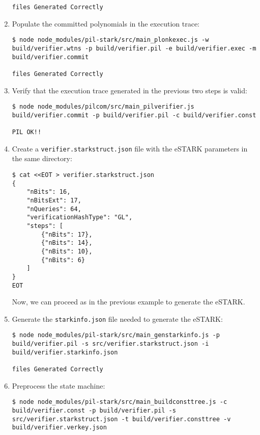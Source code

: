 \begin{enumerate}
\begin{lstlisting}[style=termt]
files Generated Correctly
\end{lstlisting}

\item Populate the committed polynomials in the execution trace:
\begin{lstlisting}[style=termt]
$ node node_modules/pil-stark/src/main_plonkexec.js -w build/verifier.wtns -p build/verifier.pil -e build/verifier.exec -m build/verifier.commit

files Generated Correctly
\end{lstlisting}

\item Verify that the execution trace generated in the previous two steps is valid:
\begin{lstlisting}[style=termt]
$ node node_modules/pilcom/src/main_pilverifier.js build/verifier.commit -p build/verifier.pil -c build/verifier.const

PIL OK!!
\end{lstlisting}

\item Create a \texttt{verifier.starkstruct.json} file with the eSTARK parameters in the same directory:
\begin{lstlisting}[style=termt]
$ cat <<EOT > verifier.starkstruct.json
{
    "nBits": 16,
    "nBitsExt": 17,
    "nQueries": 64,
    "verificationHashType": "GL",
    "steps": [
        {"nBits": 17},
        {"nBits": 14},
        {"nBits": 10},
        {"nBits": 6}
    ]
}
EOT
\end{lstlisting}

Now, we can proceed as in the previous example to generate the eSTARK.

\item Generate the \texttt{starkinfo.json} file needed to generate the eSTARK:
\begin{lstlisting}[style=termt]
$ node node_modules/pil-stark/src/main_genstarkinfo.js -p build/verifier.pil -s src/verifier.starkstruct.json -i build/verifier.starkinfo.json

files Generated Correctly
\end{lstlisting}

\item Preprocess the state machine:
\begin{lstlisting}[style=termt]
$ node node_modules/pil-stark/src/main_buildconsttree.js -c build/verifier.const -p build/verifier.pil -s src/verifier.starkstruct.json -t build/verifier.consttree -v build/verifier.verkey.json


\end{lstlisting}
\end{enumerate}
